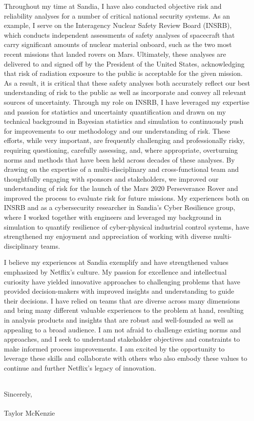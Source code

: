\documentclass[10pt]{article}
\begin{document}
Throughout my time at Sandia, I have also conducted objective risk and reliability analyses for a number of critical national security systems. As an example, I serve on the Interagency Nuclear Safety Review Board (INSRB), which conducts independent assessments of safety analyses of spacecraft that carry significant amounts of nuclear material onboard, such as the two most recent missions that landed rovers on Mars. Ultimately, these analyses are delivered to and signed off by the President of the United States, acknowledging that risk of radiation exposure to the public is acceptable for the given mission. As a result, it is critical that these safety analyses both accurately reflect our best understanding of risk to the public as well as incorporate and convey all relevant sources of uncertainty. Through my role on INSRB, I have leveraged my expertise and passion for statistics and uncertainty quantification and drawn on my technical background in Bayesian statistics and simulation to continuously push for improvements to our methodology and our understanding of risk. These efforts, while very important, are frequently challenging and professionally risky, requiring questioning, carefully assessing, and, where appropriate, overturning norms and methods that have been held across decades of these analyses. By drawing on the expertise of a multi-disciplinary and cross-functional team and thoughtfully engaging with sponsors and stakeholders, we improved our understanding of risk for the launch of the Mars 2020 Perseverance Rover and improved the process to evaluate risk for future missions. My experiences both on INSRB and as a cybersecurity researcher in Sandia's Cyber Resilience group, where I worked together with engineers and leveraged my background in simulation to quantify resilience of cyber-physical industrial control systems, have strengthened my enjoyment and appreciation of working with diverse multi-disciplinary teams.

I believe my experiences at Sandia exemplify and have strengthened values emphasized by Netflix's culture. My passion for excellence and intellectual curiosity have yielded innovative approaches to challenging problems that have provided decision-makers with improved insights and understanding to guide their decisions. I have relied on teams that are diverse across many dimensions and bring many different valuable experiences to the problem at hand, resulting in analysis products and insights that are robust and well-founded as well as appealing to a broad audience. I am not afraid to challenge existing norms and approaches, and I seek to understand stakeholder objectives and constraints to make informed process improvements. I am excited by the opportunity to leverage these skills and collaborate with others who also embody these values to continue and further Netflix's legacy of innovation.


\noindent \\Sincerely,\\\\
Taylor McKenzie
\end{document}
